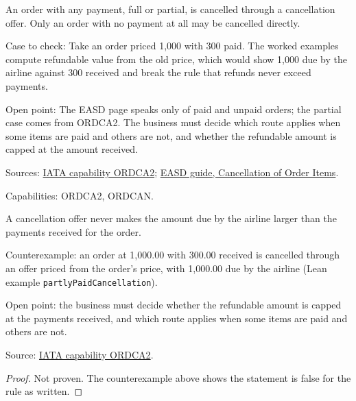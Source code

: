 \begin{definition}
  \label{def:change-cancellation-partly-paid-cancel}
  An order with any payment, full or partial, is cancelled through a
  cancellation offer. Only an order with no payment at all may be cancelled
  directly.

  Case to check: Take an order priced 1,000 with 300 paid. The worked
  examples compute refundable value from the old price, which would show
  1,000 due by the airline against 300 received and break the rule that
  refunds never exceed payments.

  Open point: The EASD page speaks only of paid and unpaid orders; the
  partial case comes from ORDCA2. The business must decide which route
  applies when some items are paid and others are not, and whether the
  refundable amount is capped at the amount received.

  Sources: \href{https://retailing.iata.org/armi/docs/ORDCA2/}{IATA capability ORDCA2};
  \href{https://standards.atlassian.net/wiki/spaces/EASD/pages/574783569}{EASD guide, Cancellation of Order Items}.

  Capabilities: ORDCA2, ORDCAN.
\end{definition}

\begin{theorem}
  \label{thm:change-cancellation-offer-within-payments}
  A cancellation offer never makes the amount due by the airline larger than
  the payments received for the order.

  Counterexample: an order at 1,000.00 with 300.00 received is cancelled
  through an offer priced from the order's price, with 1,000.00 due by the
  airline (Lean example \texttt{partlyPaidCancellation}).

  Open point: the business must decide whether the refundable amount is
  capped at the payments received, and which route applies when some items
  are paid and others are not.

  Source: \href{https://retailing.iata.org/armi/docs/ORDCA2/}{IATA capability ORDCA2}.
\end{theorem}
\begin{proof}
  Not proven.  The counterexample above shows the statement is false for the
  rule as written.
\end{proof}


